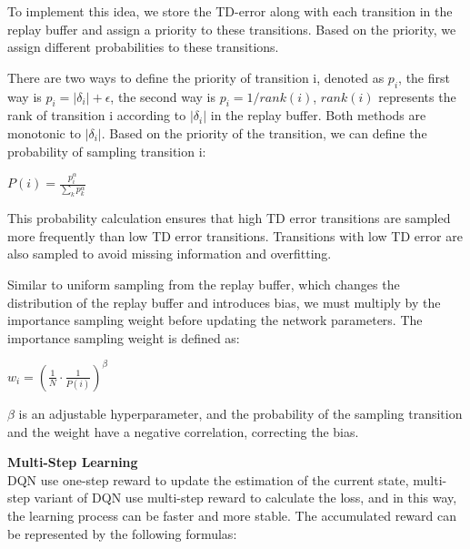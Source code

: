 \documentclass{article}
\begin{document}
To implement this idea, we store the TD-error along with each transition in the replay buffer and assign a priority to these transitions. Based on the priority, we assign different probabilities to these transitions.

There are two ways to define the priority of transition i, denoted as $p_i$,  the first way is $p_i = \lvert \delta_i \rvert + \epsilon$, the second way is $p_i = 1 / rank(i)$, $rank(i)$ represents the rank of transition i according to $\lvert \delta_i \rvert$ in the replay buffer. Both methods are monotonic to $\lvert \delta_i \rvert$. Based on the priority of the transition, we can define the probability of sampling transition i:

\hspace*{\fill}

$P(i)=\frac{p_i^\alpha}{\sum_k p_k^\alpha}$

\hspace*{\fill}

This probability calculation ensures that high TD error transitions are sampled more frequently than low TD error transitions. Transitions with low TD error are also sampled to avoid missing information and overfitting.

Similar to uniform sampling from the replay buffer, which changes the distribution of the replay buffer and introduces bias, we must multiply by the importance sampling weight before updating the network parameters. The importance sampling weight is defined as:

\hspace*{\fill}

$w_i=\left(\frac{1}{N} \cdot \frac{1}{P(i)}\right)^\beta$

\hspace*{\fill}

$\beta$ is an adjustable hyperparameter, and the probability of the sampling transition and the weight have a negative correlation, correcting the bias.

\hspace*{\fill}

\noindent
\textbf{Multi-Step Learning}\\
\noindent
DQN use one-step reward to update the estimation of the current state, multi-step variant of DQN use multi-step reward to calculate the loss, and in this way, the learning process can be faster and more stable. The accumulated reward can be represented by the following formulas:
\end{document}
